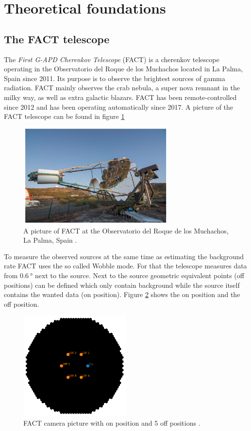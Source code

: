 \section{Theoretical foundations}
\label{sec:Theorie}
\subsection{The FACT telescope}
The \textit{First G-APD Cherenkov Telescope} (FACT) is a cherenkov telescope operating in the Observatorio del Roque de los Muchachos located in La Palma, Spain since 2011.
Its purpose is to observe the brightest sources of gamma radiation.
FACT mainly observes the crab nebula, a super nova remnant in the milky way, as well as extra galactic blazars.
FACT has been remote-controlled since 2012 and has been operating automatically since 2017.
A picture of the FACT telescope can be found in figure \ref{fig:FACT}

\begin{figure}
  \centering
  \includegraphics[width=0.7\textwidth]{graphics/FACT.png}
  \caption{A picture of FACT at the Observatorio del Roque de los Muchachos, La Palma, Spain \cite{sample}.}
  \label{fig:FACT}
\end{figure}

To measure the observed sources at the same time as estimating the background rate FACT uses the so called Wobble mode.
For that the telescope measures data from $\SI{0.6}{\degree}$ next to the source.
Next to the source geometric equivalent points (off positions) can be defined which only contain background while the source itself contains the wanted data (on position).
Figure \ref{fig:OnOff} shows the on position and the off position.

\begin{figure}
  \centering
  \includegraphics[width=0.5\textwidth]{graphics/OnOff.png}
  \caption{FACT camera picture with on position and 5 off positions \cite{sample}.}
  \label{fig:OnOff}
\end{figure}

